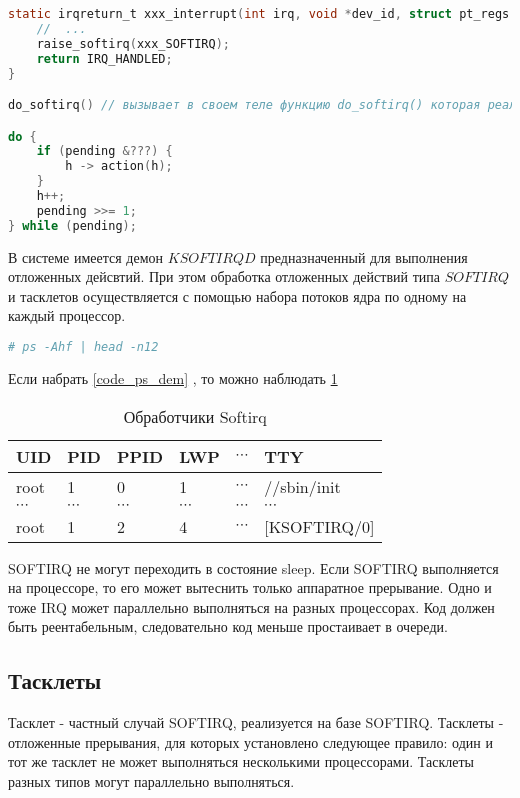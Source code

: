 \begin{lstlisting}[language=c]
static irqreturn_t xxx_interrupt(int irq, void *dev_id, struct pt_regs *regs) {
	//  ...
	raise_softirq(xxx_SOFTIRQ);
	return IRQ_HANDLED;
}

do_softirq() // вызывает в своем теле функцию do_softirq() которая реализована просто. Основной цикл этой функции: в системе есть очередь отложенных прерываний, проверяет их все и вызывает ожидающие обработчики.

do {
	if (pending &???) {
		h -> action(h);
	}
	h++;
	pending >>= 1;
} while (pending);
\end{lstlisting}

В системе имеется демон $KSOFTIRQD$ предназначенный для выполнения отложенных дейсвтий. При этом обработка отложенных действий типа $SOFTIRQ$ и тасклетов осуществляется с помощью набора потоков ядра по одному на каждый процессор. 

\begin{lstlisting}[language=bash, caption = codepsdem, label=code_ps_dem]
# ps -Ahf | head -n12
\end{lstlisting}

Если набрать \ref{code_ps_dem} , то можно наблюдать \ref{table_handler_irq}

\begin{table}[H]
\caption{Обработчики Softirq}
\label{table_handler_irq}
\begin{tabular}{|l|l|l|l|l|l|}
\hline
UID & PID & PPID & LWP & $\cdots$ & TTY\\
\hline
root & 1 & 0 & 1 & $\cdots$ & //sbin/init \\
$\cdots$ & $\cdots$ & $\cdots$ & $\cdots$ & $\cdots$ & $\cdots$\\
root & 1 & 2 & 4 & $\cdots$ & [KSOFTIRQ/0]\\
\hline
\end{tabular}
\end{table}

SOFTIRQ не могут переходить в состояние sleep. Если SOFTIRQ выполняется на процессоре, то его может вытеснить только аппаратное прерывание. Одно и тоже IRQ может параллельно выполняться на разных процессорах. Код должен быть реентабельным, следовательно код меньше простаивает в очереди.

\subsection{Тасклеты}
Тасклет - частный случай SOFTIRQ, реализуется на базе SOFTIRQ. Тасклеты - отложенные прерывания, для которых установлено следующее правило: один и тот же тасклет не может выполняться несколькими процессорами. Тасклеты разных типов могут параллельно выполняться.

